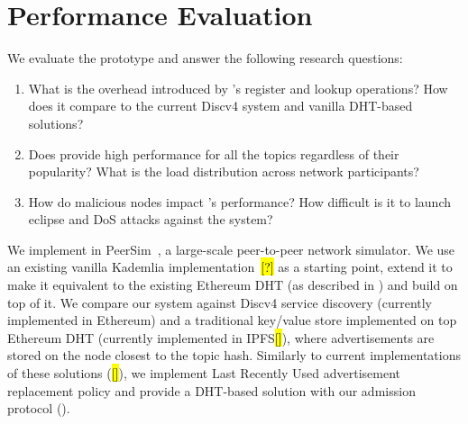 
\section{Performance Evaluation}
\label{sec:eval}

We evaluate the \sysname prototype and answer the following research questions:
\begin{enumerate}
    \item What is the overhead introduced by \sysname's register and lookup operations? How does it compare to the current Discv4 system and vanilla DHT-based solutions?
    \item Does \sysname provide high performance for all the topics regardless of their popularity? What is the load distribution across network participants?
    \item How do malicious nodes impact \sysname’s performance? How difficult is it to launch eclipse and DoS attacks against the system?
\end{enumerate}

 We implement \sysname in PeerSim~\cite{p2p09-peersim}, a large-scale peer-to-peer network simulator. We use an existing vanilla Kademlia implementation~\hl{[?]} as a starting point, extend it to make it equivalent to the existing Ethereum DHT (as described in ) and build \sysname on top of it. We compare our system against Discv4 service discovery (currently implemented in Ethereum) and a traditional key/value store implemented on top Ethereum DHT (currently implemented in IPFS\hl{[]}), where advertisements are stored on the node closest to the topic hash. Similarly to current implementations of these solutions (\hl{[]}), we implement Last Recently Used advertisement replacement policy and provide a DHT-based solution with our admission protocol (). 

